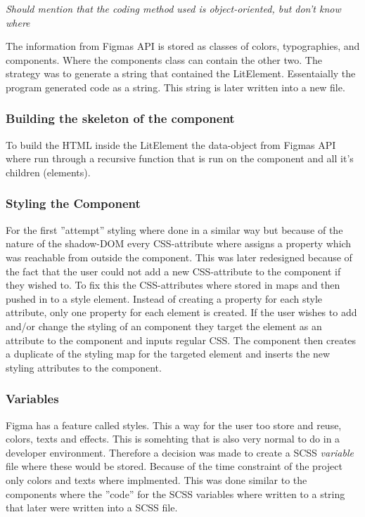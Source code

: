 \textit{Should mention that the coding method used is object-oriented, but don't know where}

The information from Figmas API is stored as classes of colors, typographies, and components. Where the components class can contain the other two.  The strategy was to generate a string that contained the LitElement. Essentaially the program generated code as a string. This string is later written into a new file.

\subsubsection{Building the skeleton of the component}%
\label{ssub:building the skeleton of the component}
To build the HTML inside the LitElement the data-object from Figmas API where run through a recursive function that is run on the component and all it's children (elements).

\subsubsection{Styling the Component}%
\label{ssub:Styling the component}
For the first ''attempt'' styling where done in a similar way but because of the nature of the shadow-DOM every CSS-attribute where assigns a property which was reachable from outside the component. This was later redesigned because of the fact that the user could not add a new CSS-attribute to the component if they wished to. To fix this the CSS-attributes where stored in maps \cite{ArrayPrototypeMap} and then pushed in to a style element. Instead of creating a property for each style attribute, only one property for each element is created. If the user wishes to add and/or change the styling of an component they target the element as an attribute to the component and inputs regular CSS. The component then creates a duplicate of the styling map for the targeted element and inserts the new styling attributes to the component.


\subsubsection{Variables}%
\label{ssub:Variables}
Figma has a feature called styles. This a way for the user too store and reuse, colors, texts and effects. This is somehting that is also very normal to do in a developer environment. Therefore a decision was made to create a SCSS \textit{variable} file where these would be stored. Because of the time constraint of the project only colors and texts where implmented. This was done similar to the components where the ''code'' for the SCSS variables where written to a string that later were written into a SCSS file. 


